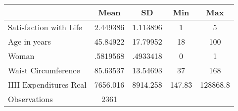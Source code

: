 {
\def\sym#1{\ifmmode^{#1}\else\(^{#1}\)\fi}
\begin{tabular}{l*{1}{cccc}}
\hline\hline
                    &        Mean&          SD&         Min&         Max\\
\hline
Satisfaction with Life&    2.449386&    1.113896&           1&           5\\
Age in years        &    45.84922&    17.79952&          18&         100\\
Woman               &    .5819568&    .4933418&           0&           1\\
Waist Circumference &    85.63537&    13.54693&          37&         168\\
HH Expenditures Real&    7656.016&    8914.258&      147.83&    128868.8\\
\hline
Observations        &        2361&            &            &            \\
\hline\hline
\end{tabular}
}
